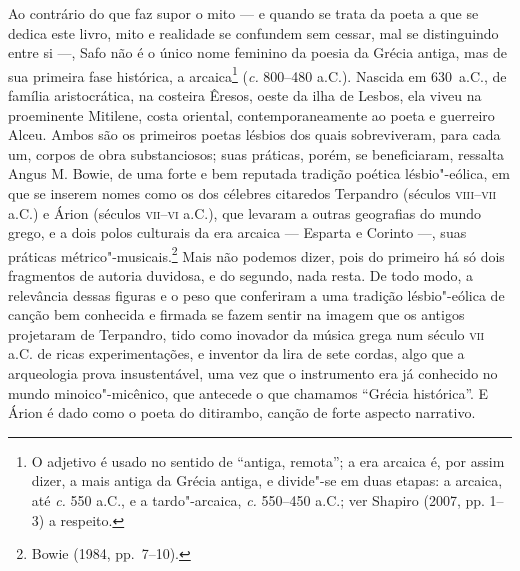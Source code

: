 \noindent{}Ao contrário do que faz supor o mito --- e quando se trata da poeta a que se
dedica este livro, mito e realidade se confundem sem cessar, mal se
distinguindo entre si ---, Safo não é o único nome feminino da poesia da Grécia
antiga, mas de sua primeira fase histórica, a arcaica\footnote{ O adjetivo é
usado no sentido de “antiga, remota”; a era arcaica é, por assim dizer, a mais
antiga da Grécia antiga, e divide"-se em duas etapas: a arcaica, até \textit{c.}
550 a.C., e a tardo"-arcaica, \textit{c.} 550--450 a.C.; ver Shapiro (2007, pp.
1--3) a respeito.} (\textit{c.} 800--480 a.C.). Nascida em 630~a.C., de família
aristocrática, na costeira Êresos, oeste da ilha de Lesbos, ela viveu na
proeminente Mitilene, costa oriental, contemporaneamente ao poeta e guerreiro
Alceu. Ambos são os primeiros poetas lésbios dos quais sobreviveram, para cada
um, corpos de obra substanciosos; suas práticas, porém, se beneficiaram,
ressalta Angus M. Bowie, de uma forte e bem reputada tradição
poética lésbio"-eólica, em que se inserem nomes como os dos célebres citaredos
Terpandro (séculos \textsc{viii}--\textsc{vii} a.C.) e Árion (séculos
\textsc{vii}--\textsc{vi} a.C.), que levaram a
outras geografias do mundo grego, e a dois polos culturais da era arcaica ---
Esparta e Corinto ---, suas práticas métrico"-musicais.\footnote{ Bowie (1984,
pp.~7--10).} Mais não podemos dizer,
pois do primeiro há só dois fragmentos de autoria duvidosa, e do segundo, nada
resta. De todo modo, a relevância dessas figuras e o peso que conferiram a uma
tradição lésbio"-eólica de canção bem conhecida e firmada se
fazem sentir na imagem que os antigos projetaram de Terpandro, tido como
inovador da música grega num século \textsc{vii} a.C. de ricas experimentações, e
inventor da lira de sete cordas, algo que a arqueologia prova insustentável,
uma vez que o instrumento era já conhecido no mundo minoico"-micênico, que
antecede o que chamamos “Grécia histórica”. E Árion é dado como o
poeta do ditirambo, canção de forte aspecto narrativo.

